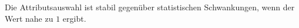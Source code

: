 Die Attributsauswahl ist stabil gegenüber statistischen Schwankungen, wenn der Wert nahe zu $1$ ergibt.
